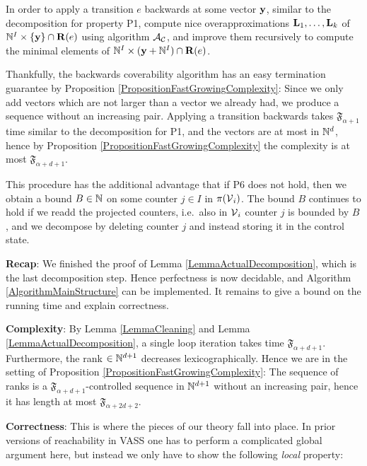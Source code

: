 In order to apply a transition \(e\) backwards at some vector \(\mathbf{y}\), similar to the decomposition for property P1, compute nice overapproximations \(\mathbf{L}_1, \dots, \mathbf{L}_k\) of \(\mathbb{N}^{I} \times \{\mathbf{y}\} \cap \mathbf{R}(e)\) using algorithm \(\mathcal{A}_{\mathcal{C}}\), and improve them recursively to compute the minimal elements of \(\mathbb{N}^{I} \times (\mathbf{y}+\mathbb{N}^I) \cap \mathbf{R}(e)\). %

Thankfully, the backwards coverability algorithm has an easy termination guarantee by Proposition \ref{PropositionFastGrowingComplexity}: Since we only add vectors which are not larger than a vector we already had, we produce a sequence without an increasing pair. Applying a transition backwards takes \(\mathfrak{F}_{\alpha+1}\) time similar to the decomposition for P1, and the vectors are at most in \(\mathbb{N}^d\), hence by Proposition \ref{PropositionFastGrowingComplexity} the complexity is at most \(\mathfrak{F}_{\alpha+d+1}\).

This procedure has the additional advantage that if P6 does not hold, then we obtain a bound \(B \in \mathbb{N}\) on some counter \(j \in I\) in \(\pi(\operatorname{\mathcal{V}}_i)\). The bound \(B\) continues to hold if we readd the projected counters, i.e.\ also in \(\operatorname{\mathcal{V}}_i\) counter \(j\) is bounded by \(B\), and we decompose by deleting counter \(j\) and instead storing it in the control state.

\textbf{Recap}: We finished the proof of Lemma \ref{LemmaActualDecomposition}, which is the last decomposition step. Hence perfectness is now decidable, and Algorithm \ref{AlgorithmMainStructure} can be implemented. It remains to give a bound on the running time and explain correctness.

\textbf{Complexity}: By Lemma \ref{LemmaCleaning} and Lemma \ref{LemmaActualDecomposition}, a single loop iteration takes time \(\mathfrak{F}_{\alpha+d+1}\). Furthermore, the rank \(\in \mathbb{N}^{d+1}\) decreases lexicographically. Hence we are in the setting of Proposition \ref{PropositionFastGrowingComplexity}: The sequence of ranks is a \(\mathfrak{F}_{\alpha+d+1}\)-controlled sequence in \(\mathbb{N}^{d+1}\) without an increasing pair, hence it has length at most \(\mathfrak{F}_{\alpha+2d+2}\).

\textbf{Correctness}: This is where the pieces of our theory fall into place. In prior versions of reachability in VASS one has to perform a complicated global argument here, but instead we only have to show the following \emph{local} property:

